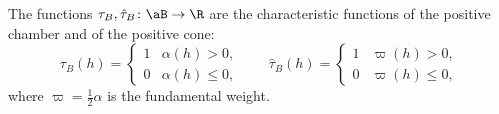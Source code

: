 The functions $\tau_B,\hat\tau_B\colon\aB\to\R$ are the characteristic functions of the positive chamber and of the
positive cone:
\[
  \tau_B(h)=\begin{cases}1&\alpha(h)>0,\\0&\alpha(h)\le0,\end{cases}\qquad
  \hat\tau_B(h)=\begin{cases}1&\varpi(h)>0,\\0&\varpi(h)\le0,\end{cases}
\]
where $\varpi=\frac12\alpha$ is the fundamental weight.
